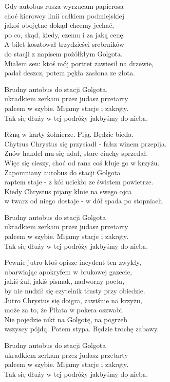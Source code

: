 \begin{text}
    Gdy autobus rusza wyrzucam papierosa\\
    choć kierowcy linii całkiem podmiejskiej\\
    jakoś obojętne dokąd chcemy jechać,\\
    po co, skąd, kiedy, czemu i za jaką cenę.\\
    A bilet kosztował trzydzieści srebrników\\
    do stacji z napisem pożółkłym Golgota.\\
    Miałem sen: ktoś mój portret zawiesił na drzewie,\\
    padał deszcz, potem pękła zasłona ze złota.

    Brudny autobus do stacji Golgota,\\
    ukradkiem zerkam przez judasz przetarty\\
    palcem w szybie. Mijamy stacje i zakręty.\\
    Tak się dłuży w tej podróży jakbyśmy do nieba.

    Rżną w karty żołnierze. Piją. Będzie bieda.\\
    Chytrus Chrystus się przysiadł - fałsz winem przepija.\\
    Znów handel mu się udał, stare ciuchy sprzedał.\\
    Więc się cieszy, choć od rana coś kłuje go w krzyżu.\\
    Zapomniany autobus do stacji Golgota\\
    raptem staje - z kół uciekło ze świstem powietrze.\\
    Kiedy Chrystus pijany klnie na swego ojca\\
    w twarz od niego dostaje - w dół spada po stopniach.

    Brudny autobus do stacji Golgota\\
    ukradkiem zerkam przez judasz przetarty\\
    palcem w szybie. Mijamy stacje i zakręty.\\
    Tak się dłuży w tej podróży jakbyśmy do nieba.

    Pewnie jutro ktoś opisze incydent ten zwykły,\\
    ubarwiając apokryfem w brukowej gazecie,\\
    jakiś żul, jakiś pismak, nadworny poeta,\\
    by nie nudził się czytelnik tłusty przy obiedzie.\\
    Jutro Chrystus się doigra, zawiśnie na krzyżu,\\
    może za to, że Piłata w pokera oszwabi.\\
    Nie pojedzie nikt na Golgotę, na pogrzeb\\
    wszyscy pójdą. Potem stypa. Będzie trochę zabawy.

    Brudny autobus do stacji Golgota\\
    ukradkiem zerkam przez judasz przetarty\\
    palcem w szybie. Mijamy stacje i zakręty.\\
    Tak się dłuży w tej podróży jakbyśmy do nieba.
\end{text}
\begin{chord}

\end{chord}